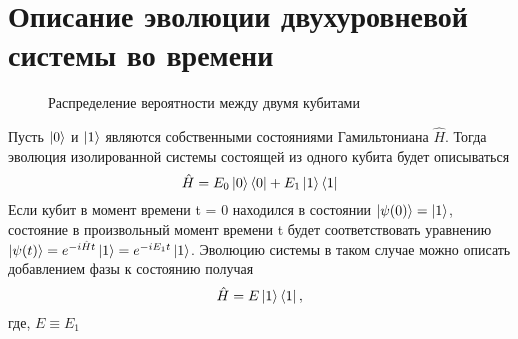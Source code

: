 \documentclass[a4paper, 10pt]{article}
\begin{document}
        \section{Описание эволюции двухуровневой системы во времени}

    \begin{wrapfigure}{r}{0.5\textwidth}
        \captionsetup{justification= centering, margin = 0.1 cm}
        \caption{Распределение вероятности между двумя кубитами}
    \end{wrapfigure}
    
    Пусть $\ket{0}$ и $\ket{1}$ являются собственными состояниями Гамильтониана  $\hat{H}$. Тогда эволюция изолированной системы состоящей из одного кубита будет описываться 
    \\
    \begin{equation}
        \hat{H} = E_0 \ket{0}\bra{0} + E_1 \ket{1}\bra{1}
    \end{equation}
   Если кубит в момент времени t = 0 находился в состоянии $\ket{\psi(0)} = \ket{1}$, состояние в произвольный момент времени t будет соответствовать уравнению $\ket{\psi(t)}=e^{-i\hat{H}t}\ket{1} = e^{-iE_1t}\ket{1}$. 
   Эволюцию системы в таком случае можно описать добавлением фазы к состоянию получая
    \begin{equation}
        \hat{H} = E \ket{1}\bra{1}, 
    \end{equation}
    где, $E \equiv E_1$

    
\end{document}
